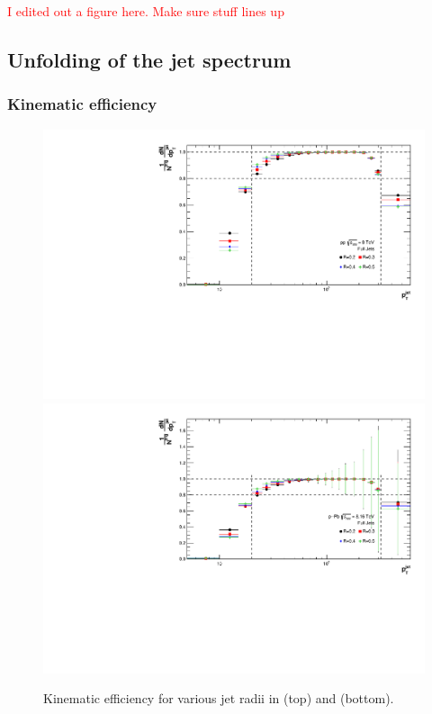 \textcolor{red}{I edited out a figure here. Make sure stuff lines up}

\subsection{Unfolding of the jet spectrum}
\label{sec:unfolding}
\subsubsection{Kinematic efficiency}
\label{subsec:kinEff}

\begin{figure}
    \centering
    \includegraphics[width=15cm]{figures/KinematicEfficiency/EffKine.pdf}
    \includegraphics[width=15cm]{figures/pPbFigures/KinematicEfficiency/EffKine.pdf}
    \caption{Kinematic efficiency for various jet radii in \pp (top) and \pPb (bottom).}
    \label{fig:KinematicEfficiency}
\end{figure}

